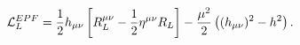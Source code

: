 \begin{equation}
{\cal L}_L^{EPF} = \frac{1}{2}h_{\mu\nu} \left[ R^{\mu\nu}_L - 
\frac{1}{2} \eta^{\mu\nu} R_L\right] - \frac{\mu^2}{2}\left((h_{\mu\nu})^2
 - h^2 \right).
\label{63}
\end{equation}

